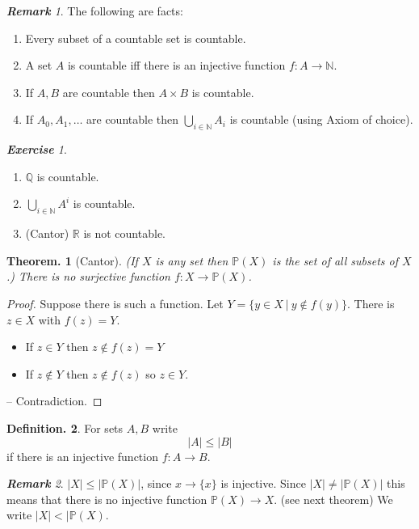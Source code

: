 \documentclass[a4paper,oneside,11pt,DIV=12,parskip=half]{scrartcl}
\newcommand{\R}{\mathbb R}
\newcommand{\N}{\mathbb N}
\theoremstyle{plain}
\newtheorem{theorem}{Theorem.}[section]
\theoremstyle{definition}
\newtheorem{definition}[theorem]{Definition.}
\newtheorem{remark, definition}[theorem]{Remark and Definition.}
\newtheorem{lemma, definition}[theorem]{Lemma and Definition.}
\newtheorem{theorem, definition}[theorem]{Theorem and Definition.}
\theoremstyle{remark}
\newtheorem*{remark}{\textbf{Remark}}
\newtheorem*{exercise}{\textbf{Exercise}}
\newtheorem*{remark, example}{\textbf{Remark and Exercise}}
\begin{document}
\begin{remark}
The following are facts:
\begin{enumerate}
    \item Every subset of a countable set is countable.
    \item A set $A$ is countable iff there is an injective function $f: A \rightarrow \N$.
    \item If $A,B$ are countable then $A\times B$ is countable.
    \item If $A_0,A_1,\dots$ are countable then $\bigcup_{i \in \N} A_i$ is countable (using Axiom of choice).
\end{enumerate}
\end{remark}

\begin{exercise}
    \begin{enumerate}
        \item $\mathbb{Q}$ is countable.
        \item $\bigcup_{i \in \N} A^i$ is countable.
        \item (Cantor) $\R$ is not countable.
    \end{enumerate}
\end{exercise}

\begin{theorem}[Cantor]
(If $X$ is any set then $\mathbb{P}(X)$ is the set of all subsets of $X$.) There is no surjective function $f: X \rightarrow \mathbb{P}(X)$.
\end{theorem}
\begin{proof}
Suppose there is such a function.
Let $Y  = \{ y \in X ~|~ y \not \in f(y) \}$.
There is $z \in X$ with $f(z) = Y$.
    \begin{itemize}
        \item If $z \in Y$ then $z \not \in f(z) = Y$
        \item If $z \not \in Y$ then $z \not \in f(z)$ so $z \in Y$.
    \end{itemize}
-- Contradiction.
\end{proof}

\begin{definition}
For sets $A,B$ write
    \[ |A| \leq |B| \]
if there is an injective function $f:A \rightarrow B$.
\end{definition}

\begin{remark}
$|X| \leq |\mathbb{P}(X)|$, since $x \rightarrow \{ x \}$ is injective. Since $|X| \neq |\mathbb{P}(X)|$ this means that there is no injective function $\mathbb{P}(X) \rightarrow X$. (see next theorem) We write $|X| < |\mathbb{P}(X)$.
\end{remark}
\end{document}
